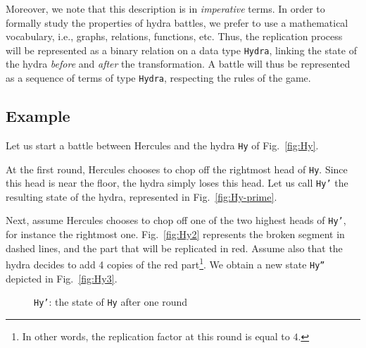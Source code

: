 Moreover, we note that this description is in \emph{imperative} terms. In order to formally study the properties of hydra battles, we prefer to use a mathematical vocabulary, i.e., graphs, relations, functions, etc.
Thus, the replication process will be represented as a binary relation on a data type \texttt{Hydra},
linking the state of the hydra \emph{before} and \emph{after} the transformation.
A battle will thus be represented as a sequence of terms of type \texttt{Hydra}, respecting the rules of the game.





\subsection{Example}
Let us start a battle between Hercules and the hydra \texttt{Hy} of Fig.~\ref{fig:Hy}.

At the first round, Hercules chooses to chop off the rightmost head of \texttt{Hy}.
Since this head is near the floor, the hydra simply loses this head. Let us call 
 \texttt{Hy'} the resulting state of the hydra, represented in Fig.~\vref{fig:Hy-prime}.

Next, assume Hercules chooses to chop off one of the two highest heads of \texttt{Hy'}, for instance the rightmost one. Fig.~\vref{fig:Hy2} represents the broken segment in dashed lines, and the part that will be replicated in red. Assume also that the hydra decides to add 4 copies of the red part\footnote{In other words, the replication factor at this round is equal to $4$.}. We obtain a new state \texttt{Hy''} depicted in Fig.~\ref{fig:Hy3}.



\begin{figure}[h]
\centering
{}

\caption{\texttt{Hy'}: the state  of \texttt{Hy} after one round \label{fig:Hy-prime}}
\end{figure}


